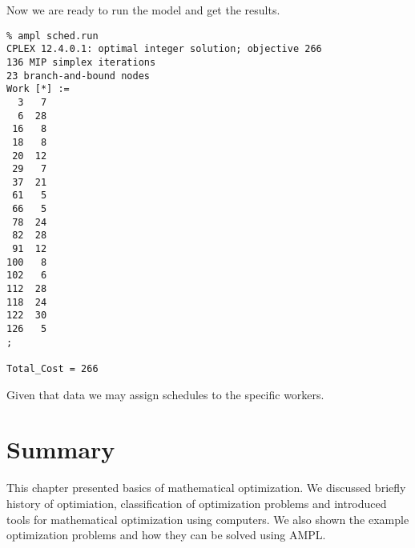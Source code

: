 Now we are ready to run the model and get the results.

\begin{lstlisting}
% ampl sched.run
CPLEX 12.4.0.1: optimal integer solution; objective 266
136 MIP simplex iterations
23 branch-and-bound nodes
Work [*] :=
  3   7
  6  28
 16   8
 18   8
 20  12
 29   7
 37  21
 61   5
 66   5
 78  24
 82  28
 91  12
100   8
102   6
112  28
118  24
122  30
126   5
;

Total_Cost = 266
\end{lstlisting}

Given that data we may assign schedules to the specific workers.

\section{Summary}

This chapter presented basics of mathematical optimization. We discussed briefly history of optimiation, classification of optimization problems and introduced tools for mathematical optimization using computers. We also shown the example optimization problems and how they can be solved using AMPL.
